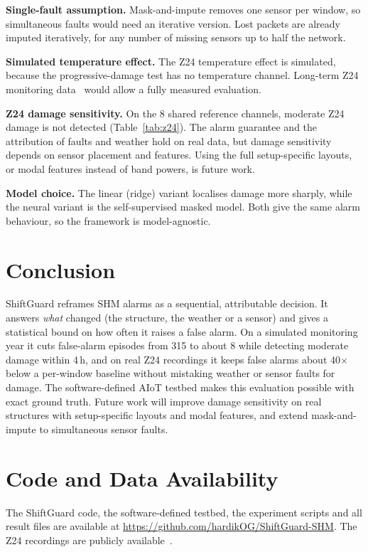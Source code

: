 \documentclass[conference]{IEEEtran}
\begin{document}
\textbf{Single-fault assumption.} Mask-and-impute removes one sensor per window, so simultaneous faults would need an iterative version. Lost packets are already imputed iteratively, for any number of missing sensors up to half the network.

\textbf{Simulated temperature effect.} The Z24 temperature effect is simulated, because the progressive-damage test has no temperature channel. Long-term Z24 monitoring data~\cite{peeters2001} would allow a fully measured evaluation.

\textbf{Z24 damage sensitivity.} On the 8 shared reference channels, moderate Z24 damage is not detected (Table~\ref{tab:z24}). The alarm guarantee and the attribution of faults and weather hold on real data, but damage sensitivity depends on sensor placement and features. Using the full setup-specific layouts, or modal features instead of band powers, is future work.

\textbf{Model choice.} The linear (ridge) variant localises damage more sharply, while the neural variant is the self-supervised masked model. Both give the same alarm behaviour, so the framework is model-agnostic.

\section{Conclusion}
ShiftGuard reframes SHM alarms as a sequential, attributable decision. It answers \emph{what} changed (the structure, the weather or a sensor) and gives a statistical bound on how often it raises a false alarm. On a simulated monitoring year it cuts false-alarm episodes from 315 to about 8 while detecting moderate damage within 4\,h, and on real Z24 recordings it keeps false alarms about 40$\times$ below a per-window baseline without mistaking weather or sensor faults for damage. The software-defined AIoT testbed makes this evaluation possible with exact ground truth. Future work will improve damage sensitivity on real structures with setup-specific layouts and modal features, and extend mask-and-impute to simultaneous sensor faults.

\section*{Code and Data Availability}
The ShiftGuard code, the software-defined testbed, the experiment scripts and all result files are available at \url{https://github.com/hardikOG/ShiftGuard-SHM}. The Z24 recordings are publicly available~\cite{z24,z24hf}.
\end{document}
